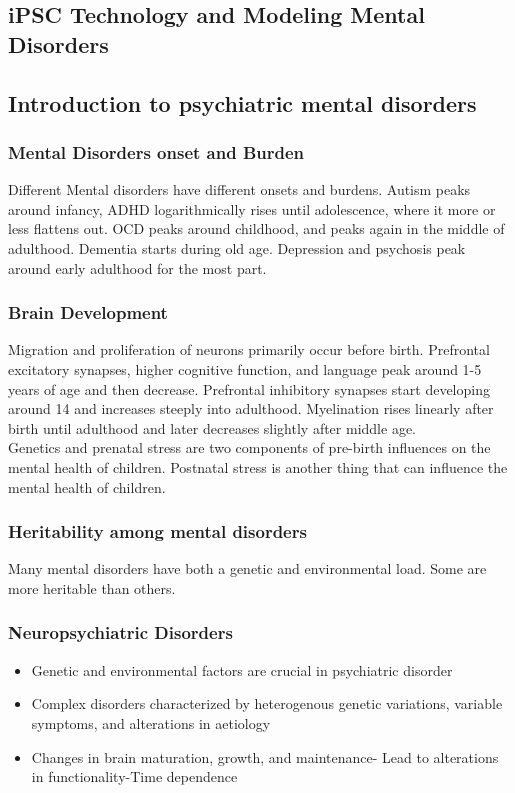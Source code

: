 \begin{itemize}
\section{iPSC Technology and Modeling Mental Disorders}
\subsection{Introduction to psychiatric mental disorders}
\subsubsection{Mental Disorders onset and Burden}
Different Mental disorders have different onsets and burdens. Autism peaks around infancy, ADHD logarithmically rises until adolescence, where it more or less flattens out. OCD peaks around childhood, and peaks again in the middle of adulthood. Dementia starts during old age. Depression and psychosis peak around early adulthood for the most part.

\subsubsection{Brain Development}
Migration and proliferation of neurons primarily occur before birth. Prefrontal excitatory synapses, higher cognitive function, and language peak around 1-5 years of age and then decrease. Prefrontal inhibitory synapses start developing around 14 and increases steeply into adulthood. Myelination rises linearly after birth until adulthood and later decreases slightly after middle age.
\\Genetics and prenatal stress are two components of pre-birth influences on the mental health of children. Postnatal stress is another thing that can influence the mental health of children.
\subsubsection{Heritability among mental disorders}
Many mental disorders have both a genetic and environmental load. Some are more heritable than others.


\subsubsection{Neuropsychiatric Disorders}
\begin{itemize}
    \item Genetic and environmental factors are crucial in psychiatric disorder
\item Complex disorders characterized by heterogenous genetic variations, variable symptoms, and alterations in aetiology
\item Changes in brain maturation, growth, and maintenance- Lead to alterations in functionality-Time dependence
\end{itemize}


\end{itemize}

